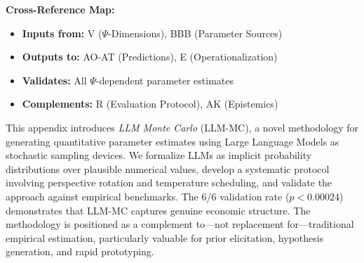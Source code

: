 
\noindent\textbf{Cross-Reference Map:}
\begin{itemize}[nosep]
    \item \textbf{Inputs from:} V ($\Psi$-Dimensions), BBB (Parameter Sources)
    \item \textbf{Outputs to:} AO-AT (Predictions), E (Operationalization)
    \item \textbf{Validates:} All $\Psi$-dependent parameter estimates
    \item \textbf{Complements:} R (Evaluation Protocol), AK (Epistemics)
\end{itemize}


\begin{tcolorbox}[colback=green!5!white, colframe=green!75!black,
    title=\textbf{Abstract}]

This appendix introduces \textit{LLM Monte Carlo} (LLM-MC), a novel methodology
for generating quantitative parameter estimates using Large Language Models as
stochastic sampling devices. We formalize LLMs as implicit probability
distributions over plausible numerical values, develop a systematic protocol
involving perspective rotation and temperature scheduling, and validate the
approach against empirical benchmarks. The 6/6 validation rate ($p < 0.00024$)
demonstrates that LLM-MC captures genuine economic structure. The methodology
is positioned as a complement to---not replacement for---traditional empirical
estimation, particularly valuable for prior elicitation, hypothesis generation,
and rapid prototyping.

\end{tcolorbox}



